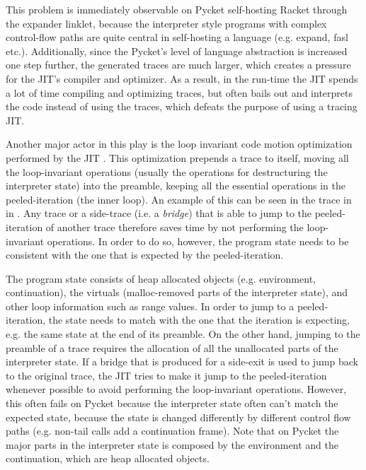 This problem is immediately observable on Pycket self-hosting Racket
through the expander linklet, because the interpreter style programs
with complex control-flow paths are quite central in self-hosting a
language (e.g. expand, fasl etc.). Additionally, since the Pycket's
level of language abstraction is increased one step further, the
generated traces are much larger, which creates a pressure for the
JIT's compiler and optimizer. As a result, in the run-time the JIT
spends a lot of time compiling and optimizing traces, but often bails
out and interprets the code instead of using the traces, which defeats
the purpose of using a tracing JIT.


Another major actor in this play is the loop invariant code motion
optimization performed by the JIT \cite{loop-aware:12}. This
optimization prepends a trace to itself, moving all the loop-invariant
operations (usually the operations for destructuring the interpreter
state) into the preamble, keeping all the essential operations in the
peeled-iteration (the inner loop). An example of this can be seen in
the trace in  in . Any trace
or a side-trace (i.e. a \emph{bridge}) that is able to jump to the
peeled-iteration of another trace therefore saves time by not
performing the loop-invariant operations. In order to do so, however,
the program state needs to be consistent with the one that is expected
by the peeled-iteration.

The program state consists of heap allocated objects
(e.g. environment, continuation), the virtuals (malloc-removed parts
of the interpreter state), and other loop information such as range
values. In order to jump to a peeled-iteration, the state needs to
match with the one that the iteration is expecting, e.g. the same
state at the end of its preamble. On the other hand, jumping to the
preamble of a trace requires the allocation of all the unallocated
parts of the interpreter state. If a bridge that is produced for a
side-exit is used to jump back to the original trace, the JIT tries to
make it jump to the peeled-iteration whenever possible to avoid
performing the loop-invariant operations. However, this often fails on
Pycket because the interpreter state often can't match the expected
state, because the state is changed differently by different control
flow paths (e.g. non-tail calls add a continuation frame). Note that
on Pycket the major parts in the interpreter state is composed by the
environment and the continuation, which are heap allocated objects.

